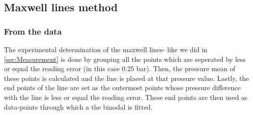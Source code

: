 \documentclass[a4paper,10pt,twocolumn]{article}
\begin{document}
    \subsection{Maxwell lines method}\label{subsec:maxwellMethod}
    \subsubsection{From the data}\label{subsubsec:maxwellFormData}
    The experimental determination of the maxwell lines- like we did in \ref{sec:Measurement} is done by  grouping all the points which are seperated by less or equal the reading error (in this case 0.25 bar).
    Then, the pressure mean of these points is calculated and the line is placed at that pressure value. 
    Lastly, the end points of the line are set as the outermost points whose pressure difference with the line is less or equal the reading error.
    These end points are then used as data-points through which a the binodal is fitted.
\end{document}
